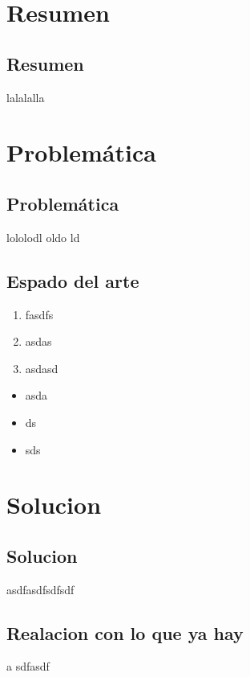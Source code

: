 \chapter{Resumen}

\section{Resumen}

lalalalla



\chapter{Problemática}

\section{Problemática}

lololodl oldo ld 


\section{Espado del arte}


\begin {enumerate}
\item fasdfs

\item asdas

\item asdasd

\end {enumerate}

\begin {itemize}
\item
asda

\item
ds

\item
sds
\end {itemize}



\chapter{Solucion}

\section{Solucion}
asdfasdfsdfsdf

\section{Realacion con lo que ya hay}
a
sdfasdf

